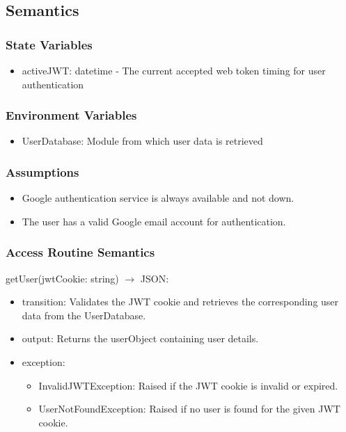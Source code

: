 \documentclass[12pt, titlepage]{article}
\begin{document}
\subsection{Semantics}

\subsubsection{State Variables}
\begin{itemize}
  \item activeJWT: datetime - The current accepted web token timing for user authentication
\end{itemize}

\subsubsection{Environment Variables}

\begin{itemize}
  \item UserDatabase: Module from which user data is retrieved
\end{itemize}

\subsubsection{Assumptions}

\begin{itemize}
  \item Google authentication service is always available and not down.
  \item The user has a valid Google email account for authentication.
\end{itemize}

\subsubsection{Access Routine Semantics}

\noindent getUser(jwtCookie: string) $\rightarrow$ JSON:
\begin{itemize}
\item transition: Validates the JWT cookie and retrieves the corresponding user data from the UserDatabase.
\item output: Returns the userObject containing user details.
\item exception: 
  \begin{itemize}
    \item InvalidJWTException: Raised if the JWT cookie is invalid or expired.
    \item UserNotFoundException: Raised if no user is found for the given JWT cookie.
  \end{itemize}
\end{itemize}
\end{document}
